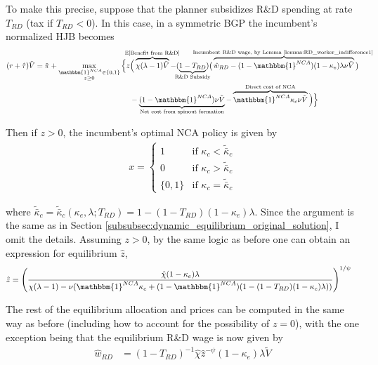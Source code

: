 \documentclass[11pt,english]{article}
\begin{document}
To make this precise, suppose that the planner subsidizes R\&D spending at rate $T_{RD}$ (tax if $T_{RD} < 0$). In this case, in a symmetric BGP the incumbent's normalized HJB becomes
\begin{align}
(r + \hat{\tau}) \tilde{V} = \tilde{\pi} + \max_{\substack{\mathbbm{1}^{NCA} \in \{0,1\} \\ z \ge 0}} \Big\{z &\Big( \overbrace{\chi (\lambda - 1) \tilde{V}}^{\mathclap{\mathbb{E}[\textrm{Benefit from R\&D}]}}- (\underbrace{1-T_{RD}}_{\mathclap{\text{R\&D Subsidy}}}) \big( \overbrace{\hat{w}_{RD} - (1-\mathbbm{1}^{NCA})(1-\kappa_e)\lambda \nu \tilde{V}}^{\mathclap{\text{Incumbent R\&D wage, by Lemma \ref{lemma:RD_worker_indifference1} }}}\big) \label{eq:hjb_incumbent_RDsubsidy} \nonumber \\ 
&-  \underbrace{(1-\mathbbm{1}^{NCA}) \nu \tilde{V}}_{\mathclap{\text{Net cost from spinout formation}}} - \overbrace{\mathbbm{1}^{NCA} \kappa_{c} \nu \tilde{V}}^{\mathclap{\text{Direct cost of NCA}}}\Big) \Big\} 
\end{align}

Then if $z > 0$, the incumbent's optimal NCA policy is given by 
\begin{align}
x = \begin{cases}
1 & \textrm{if } \kappa_{c} < \tilde{\bar{\kappa}}_c  \\
0 & \textrm{if } \kappa_{c} > \tilde{\bar{\kappa}}_c \\
\{0,1\} & \textrm{if } \kappa_c = \tilde{\bar{\kappa}}_c 
\end{cases} \label{eq:nca_policy_RDsubsidy}
\end{align}

where $\tilde{\bar{\kappa}}_c = \tilde{\bar{\kappa}}_c(\kappa_e,\lambda;T_{RD}) = 1 - (1-T_{RD})(1-\kappa_e)\lambda$. Since the argument is the same as in Section \ref{subsubsec:dynamic_equilibrium_original_solution}, I omit the details. Assuming $z > 0$, by the same logic as before one can obtain an expression for equilibrium $\hat{z}$, 
\begin{align}
\hat{z} &= \Bigg( \frac{\hat{\chi} (1-\kappa_{e}) \lambda}{\chi(\lambda -1) - \nu (\mathbbm{1}^{NCA}\kappa_c + (1-\mathbbm{1}^{NCA})(1 - (1-T_{RD})(1-\kappa_e)\lambda)) } \Bigg)^{1/\psi} \label{eq:effort_entrant_RDsubsidy}
\end{align}

The rest of the equilibrium allocation and prices can be computed in the same way as before (including how to account for the possibility of $z = 0$), with the one exception being that the equilibrium R\&D wage is now given by 
\begin{align}
\hat{w}_{RD} &= (1-T_{RD})^{-1}\hat{\chi} \hat{z}^{-\psi} (1-\kappa_e) \lambda \tilde{V} \label{eq:wage_rd_labor_RDsubsidy}
\end{align}
\end{document}

